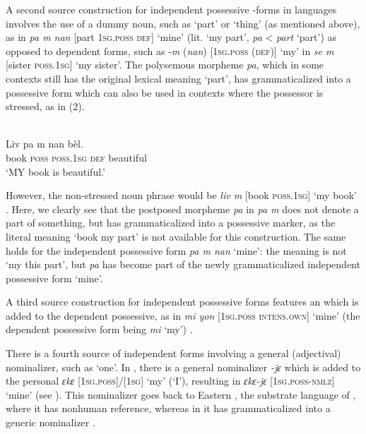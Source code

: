 \documentclass[output=paper]{langsci/langscibook}
\begin{document}
A second source construction for independent possessive -forms in  languages involves the use of a dummy noun, such as ‘part’ or ‘thing’ (as mentioned above), as in  \textit{pa m nan} [part \textsc{1sg.poss} \textsc{def}] ‘mine’ (lit. ‘my part’, \textit{pa} <  \textit{part} ‘part’) as opposed to dependent forms, such as -\textit{m} (\textit{nan}) [\textsc{1sg.poss} \textsc{(def)]} ‘my’ in \textit{se m} [sister \textsc{poss.1sg]} ‘my sister’. The polysemous morpheme \textit{pa}, which in some contexts still has the original lexical meaning ‘part’, has grammaticalized into a possessive form which can also be used in contexts where the possessor is stressed, as in (2).

\ea
{ \citep{Fattier2013}  }\\
\gll Liv  pa  m    nan  bèl.\\
     book  \textsc{poss}  \textsc{poss.1sg} \textsc{def}  beautiful \\
\glt ‘MY book is beautiful.’
\z

\noindent However, the non-stressed noun phrase would be \textit{liv m} [book \textsc{poss.1sg]} ‘my book’ \citep{Fattier2013}. Here, we clearly see that the postposed morpheme \textit{pa} in \textit{pa m} does not denote a part of something, but has grammaticalized into a possessive marker, as the literal meaning ‘book my part’ is not available for this construction. The same holds for the independent possessive form \textit{pa m nan} ‘mine’: the meaning is not ‘my this part’, but \textit{pa} has become part of the newly grammaticalized independent possessive form ‘mine’. 

A third source construction for independent possessive forms features an  which is added to the dependent possessive, as in  \textit{mi yon} [\textsc{1sg.poss} \textsc{intens.own}] ‘mine’ (the dependent possessive form being \textit{mi} ‘my’) \citep{Finney2013}.

There is a fourth source of independent forms involving a general (adjectival) nominalizer, such as ‘one’. In , there is a general nominalizer \textit{{}-jɛ} which is added to the personal  \textit{ɛkɛ} [\textsc{1sg.poss}]/[1\textsc{sg}] ‘my’ (‘I’), resulting in \textit{ɛkɛ-jɛ} [\textsc{1sg.poss-nmlz}] ‘mine’ (see ). This nominalizer goes back to Eastern , the substrate language of , where it has  nonhuman reference, whereas in  it has grammaticalized into a generic nominalizer \citep{Kouwenberg2013}.
\end{document}
